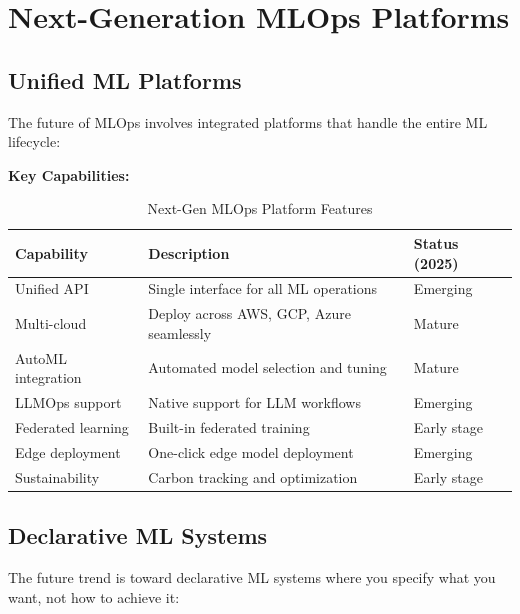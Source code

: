 \section{Next-Generation MLOps Platforms}

\subsection{Unified ML Platforms}

The future of MLOps involves integrated platforms that handle the entire ML lifecycle:

\textbf{Key Capabilities:}

\begin{table}[h]
\centering
\caption{Next-Gen MLOps Platform Features}
\begin{tabular}{p{3.5cm}p{5cm}p{4cm}}
\toprule
\textbf{Capability} & \textbf{Description} & \textbf{Status (2025)} \\
\midrule
Unified API & Single interface for all ML operations & Emerging \\
\midrule
Multi-cloud & Deploy across AWS, GCP, Azure seamlessly & Mature \\
\midrule
AutoML integration & Automated model selection and tuning & Mature \\
\midrule
LLMOps support & Native support for LLM workflows & Emerging \\
\midrule
Federated learning & Built-in federated training & Early stage \\
\midrule
Edge deployment & One-click edge model deployment & Emerging \\
\midrule
Sustainability & Carbon tracking and optimization & Early stage \\
\bottomrule
\end{tabular}
\end{table}

\subsection{Declarative ML Systems}

The future trend is toward declarative ML systems where you specify what you want, not how to achieve it:

